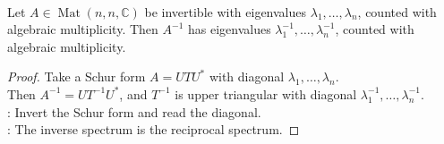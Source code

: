 \begin{corollary} \label{cor:eigenvalues-of-inverse-matrix} \\
Let $A\in\operatorname{Mat}(n,n,\mathbb{C})$ be invertible with eigenvalues $\lambda_1,\ldots,\lambda_n$, counted with algebraic multiplicity. Then $A^{-1}$ has eigenvalues $\lambda_1^{-1},\ldots,\lambda_n^{-1}$, counted with algebraic multiplicity.
\begin{proof}
Take a Schur form $A=UTU^*$ with diagonal $\lambda_1,\ldots,\lambda_n$.\\
Then $A^{-1}=UT^{-1}U^*$, and $T^{-1}$ is upper triangular with diagonal $\lambda_1^{-1},\ldots,\lambda_n^{-1}$.\\
: Invert the Schur form and read the diagonal.\\
: The inverse spectrum is the reciprocal spectrum.
\end{proof}
\end{corollary}

